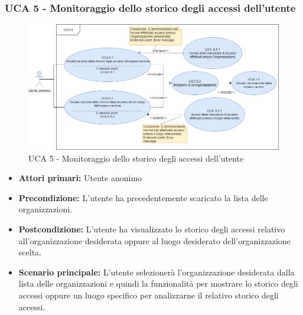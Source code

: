 \subsubsection{UCA 5 - Monitoraggio dello storico degli accessi dell'utente}

\begin{figure}[h]
	\centering	
	\includegraphics[scale=0.4, center]{sezioni/UseCase/Immagini/UCA5.png}
	\caption{UCA 5 - Monitoraggio dello storico degli accessi dell'utente}
\end{figure}

\begin{itemize}
    \item \textbf{Attori primari:} Utente anonimo
    \item \textbf{Precondizione:} L'utente ha precedentemente scaricato la lista delle organizzazioni.
    \item \textbf{Postcondizione:} L'utente ha visualizzato lo storico degli accessi relativo all'organizzazione desiderata oppure al luogo desiderato dell'organizzazione scelta.
    \item \textbf{Scenario principale:} L'utente selezionerà l'organizzazione desiderata dalla lista delle organizzazioni e quindi la funzionalità per mostrare lo storico degli accessi oppure un luogo specifico per analizzarne il relativo storico degli accessi.
\end{itemize}

